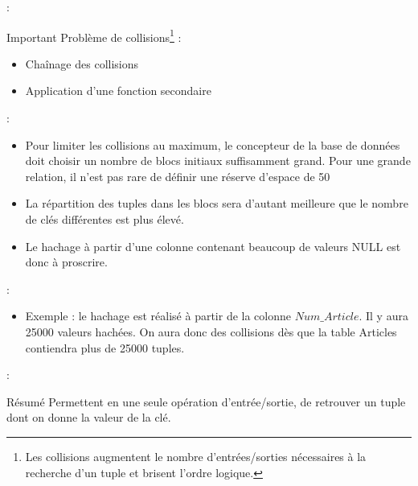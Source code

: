 \documentclass[10pt]{beamer}
\begin{document}
\begin{frame}{\secname : \subsecname}
    \begin{alertblock}{Important}
        Problème de collisions\footnote{Les collisions augmentent le nombre d'entrées/sorties nécessaires à la recherche d'un tuple et brisent l'ordre logique.} :
        \begin{itemize}
            \item Chaînage des collisions
            \item Application d'une fonction secondaire
        \end{itemize}
    \end{alertblock}
\end{frame}
\begin{frame}{\secname : \subsecname}
    \begin{itemize}
        \item Pour limiter les collisions au maximum, le concepteur de la base de données doit choisir un nombre de blocs initiaux suffisamment grand.  Pour une grande relation, il n'est pas rare de définir une réserve d'espace de 50%
        \item La répartition des tuples dans les blocs sera d'autant meilleure que le nombre de clés différentes est plus élevé.
        \item Le hachage à partir d'une colonne contenant beaucoup de valeurs NULL est donc à proscrire.
    \end{itemize}
\end{frame}

\begin{frame}{\secname : \subsecname}
    \begin{itemize}
        \item Exemple : le hachage est réalisé à partir de la colonne $Num\_Article$. Il y aura 25000 valeurs hachées. On aura donc des collisions dès que la table Articles contiendra plus de 25000 tuples.
    \end{itemize}
    
\end{frame}

\begin{frame}{\secname : \subsecname}
    \begin{alertblock}{Résumé}
        Permettent en une seule opération d'entrée/sortie, de retrouver un tuple dont on donne la valeur de la clé.
    \end{alertblock}
\end{frame}
\end{document}
